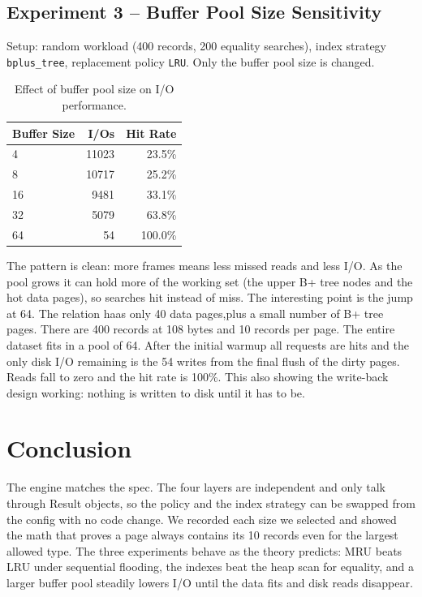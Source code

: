\documentclass[12pt]{article}
\begin{document}
\subsection{Experiment 3 -- Buffer Pool Size Sensitivity}

Setup: random workload (400 records, 200 equality searches), index
strategy \texttt{bplus\_tree}, replacement policy \texttt{LRU}. Only the
buffer pool size is changed.

\begin{table}[H]
\centering
\caption{Effect of buffer pool size on I/O performance.}
\begin{tabular}{@{}lrr@{}}
\toprule
Buffer Size & I/Os & Hit Rate \\
\midrule
4  & 11023 & 23.5\% \\
8  & 10717 & 25.2\% \\
16 & 9481  & 33.1\% \\
32 & 5079  & 63.8\% \\
64 & 54    & 100.0\% \\
\bottomrule
\end{tabular}
\end{table}

The pattern is clean: more frames means less missed reads and less I/O. As the
pool grows it can hold more of the working set (the upper B+ tree nodes and
the hot data pages), so searches hit instead of miss. The interesting point is the
jump at 64. The relation haas only 40 data pages,plus a small number of B+ tree pages.
There are 400 records at 108 bytes and 10 records per
page. The entire dataset fits in a pool of 64. After the initial warmup
all requests are hits and the only disk I/O remaining is the 54 writes from
the final flush of the dirty pages. Reads fall to zero and the hit rate is
100\%. This also showing the write-back design working: nothing is written to
disk until it has to be.

\section{Conclusion}

The engine matches the spec. The four layers are independent and only talk
through Result objects, so the policy and the index strategy can be swapped
from the config with no code change. We recorded each size we selected and
showed the math that proves a page always contains its 10 records even
for the largest allowed type. The three experiments behave as the
theory predicts: MRU beats LRU under sequential flooding, the indexes beat
the heap scan for equality, and a larger buffer pool steadily lowers I/O
until the data fits and disk reads disappear.
\end{document}

